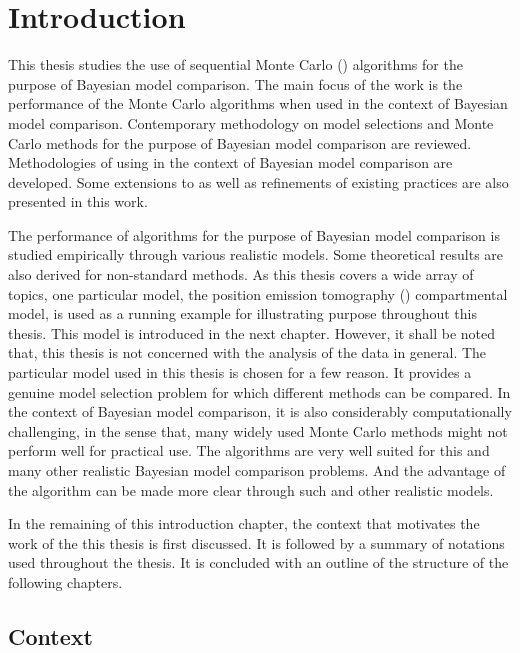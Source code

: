 \chapter{Introduction}
\label{cha:Introduction}

\begin{draftpar}
This thesis studies the use of sequential Monte Carlo (\smc) algorithms for the purpose of Bayesian model comparison. The main focus of the work is the performance of the Monte Carlo algorithms when used in the context of Bayesian model comparison. Contemporary methodology on model selections and Monte Carlo methods for the purpose of Bayesian model comparison are reviewed. Methodologies of using \smc in the context of Bayesian model comparison are developed. Some extensions to as well as refinements of existing \smc practices are also presented in this work.

The performance of \smc algorithms for the purpose of Bayesian model comparison is studied empirically through various realistic models. Some theoretical results are also derived for non-standard methods. As this thesis covers a wide array of topics, one particular model, the position emission tomography (\pet) compartmental model, is used as a running example for illustrating purpose throughout this thesis. This model is introduced in the next chapter. However, it shall be noted that, this thesis is not concerned with the analysis of the \pet data in general. The particular model used in this thesis is chosen for a few reason. It provides a genuine model selection problem for which different methods can be compared. In the context of Bayesian model comparison, it is also considerably computationally challenging, in the sense that, many widely used Monte Carlo methods might not perform well for practical use. The \smc algorithms are very well suited for this and many other realistic Bayesian model comparison problems. And the advantage of the \smc algorithm can be made more clear through such and other realistic models.

In the remaining of this introduction chapter, the context that motivates the work of the this thesis is first discussed. It is followed by a summary of notations used throughout the thesis. It is concluded with an outline of the structure of the following chapters.
\end{draftpar}

\section{Context}
\label{sec:Context}

